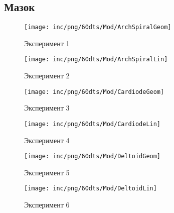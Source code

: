 \subsection{Мазок}
\begin{figure}  
	\begin{minipage}{0,5\textwidth}
		\texttt{[image: inc/png/60dts/Mod/ArchSpiralGeom]}
		\label{fig:app1}
		\caption{Эксперимент 1}
	\end{minipage}
	\begin{minipage}{0,5\textwidth}
		\texttt{[image: inc/png/60dts/Mod/ArchSpiralLin]}
		\label{fig:app2}
		\caption{Эксперимент 2}
	\end{minipage}
	
	\begin{minipage}{0,5\textwidth}
		\texttt{[image: inc/png/60dts/Mod/CardiodeGeom]}
		\label{fig:app3}
		\caption{Эксперимент 3}
	\end{minipage}
	\begin{minipage}{0,5\textwidth}
		\texttt{[image: inc/png/60dts/Mod/CardiodeLin]}
		\label{fig:app4}
		\caption{Эксперимент 4}
	\end{minipage}
	
	\begin{minipage}{0,5\textwidth}
		\texttt{[image: inc/png/60dts/Mod/DeltoidGeom]}
		\label{fig:app1}
		\caption{Эксперимент 5}
	\end{minipage}
	\begin{minipage}{0,5\textwidth}
		\texttt{[image: inc/png/60dts/Mod/DeltoidLin]}
		\label{fig:app2}
		\caption{Эксперимент 6}
	\end{minipage}
\end{figure}



